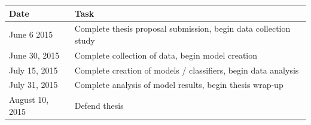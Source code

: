 \documentclass[11pt]{article}
\begin{document}
\begin{center}
\begin{tabularx}{\textwidth}{X|X}
    Date & Task\\
    \hline
    June 6 2015 & Complete thesis proposal submission, begin data collection study\\
    June 30, 2015 & Complete collection of data, begin model creation\\
    July 15, 2015 & Complete creation of models / classifiers, begin data analysis\\
    July 31, 2015 & Complete analysis of model results, begin thesis wrap-up\\
    August 10, 2015 & Defend thesis\\
\end{tabularx}
\end{center}



\end{document}
